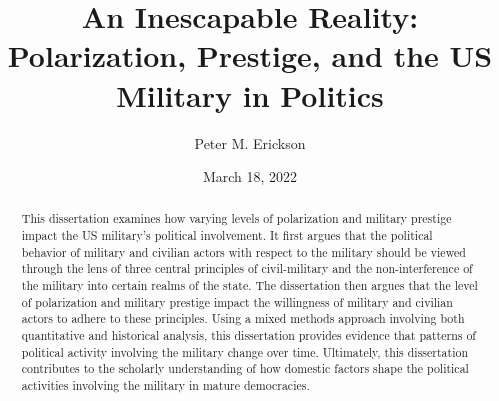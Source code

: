 \documentclass[
  12pt,
  oneside]{memoir}
\title{An Inescapable Reality: Polarization, Prestige, and the US Military in Politics}
\author{Peter M. Erickson}
\date{March 18, 2022}
\begin{document}
\maketitle
\begin{abstract}
This dissertation examines how varying levels of polarization and military
prestige impact the US military's political involvement. It first argues that the
political behavior of military and civilian actors with respect to the military
should be viewed through the lens of three central principles of civil-military
and the non-interference of the military into certain realms of the state. The dissertation
then argues that the level of polarization and military prestige impact the willingness
of military and civilian actors to adhere to these principles. Using a mixed methods
approach involving both quantitative and historical analysis, this dissertation
provides evidence that patterns of political activity involving the military change
over time. Ultimately, this dissertation contributes to the scholarly understanding
of how domestic factors shape the political activities involving the military in
mature democracies.
\end{abstract}

\cleardoublepage
\setcounter{page}{1}
\tableofcontents

\clearpage

\listoftables

\clearpage

\listoffigures

\RaggedRight

\mainmatter
{}
\DoubleSpacing
\setlength{\parindent}{2ex}
\newpage

  
\end{document}
